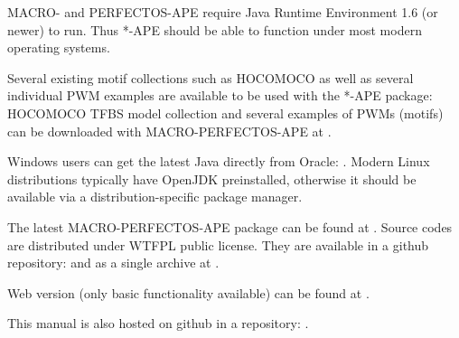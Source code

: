 MACRO- and PERFECTOS-APE require Java Runtime Environment 1.6 (or newer) to run.
Thus *-APE should be able to function under most modern operating systems.

Several existing motif collections such as HOCOMOCO as well as several individual PWM examples are available to be used with the *-APE package:
HOCOMOCO  TFBS model collection and several examples of PWMs (motifs) can be downloaded with MACRO-PERFECTOS-APE at .

Windows users can get the latest Java directly from Oracle: .
Modern Linux distributions typically have OpenJDK preinstalled, otherwise it should be available via a distribution-specific package manager.

The latest MACRO-PERFECTOS-APE package can be found at . Source codes are distributed under WTFPL public license. They are available in a github repository:  and as a single archive at .

Web version (only basic functionality available) can be found at .

This manual is also hosted on github in a repository: .
